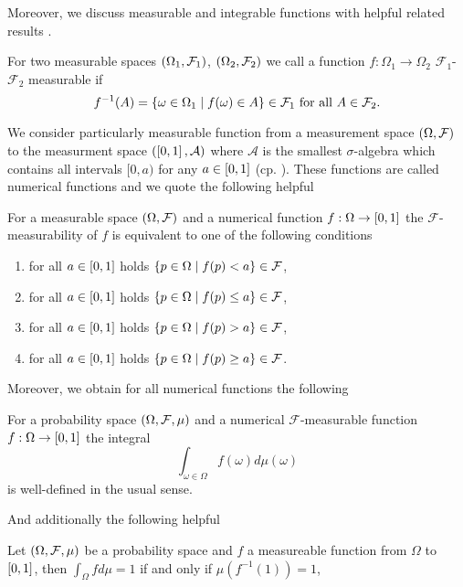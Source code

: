 Moreover, we discuss measurable and integrable functions with helpful related
results \cite[Chapter 7]{Bauer}.
\begin{definition}
  For two measurable spaces $\left(\Omega_{1}, \mathcal{F}_{1}\right)$, 
  $\left(\Omega_{2}, \mathcal{F}_{2}\right)$ we call a function 
  $f:\Omega_{1}\rightarrow\Omega_{2}$ $\mathcal{F}_{1}$-$\mathcal{F}_{2}$ 
  measurable if
  \begin{equation*}
    f^{-1}(A) = \left\{\omega\in\Omega_{1}\mid f(\omega)\in A\right\}\in\mathcal{F}_{1}
    \text{ for all }A\in\mathcal{F}_{2}.
  \end{equation*}
\end{definition}
We consider particularly measurable function from a measurement space 
$\left(\Omega, \mathcal{F}\right)$ to the measurment space
$\left(\left[0,1\right], \mathcal{A}\right)$ where $\mathcal{A}$ is the smallest
$\sigma$-algebra which contains all intervals $[0, a)$ for any 
$a\in\left[0,1\right]$ (cp. \cite[Chapter 4, Chapter 6]{Bauer}). These functions
are called numerical functions and we quote the following helpful
\begin{theorem}
  \cite[Theorem 9.2]{Bauer}
  For a measurable space $\left(\Omega, \mathcal{F}\right)$ and a numerical 
  function $f:\Omega\rightarrow\left[0,1\right]$ the 
  $\mathcal{F}$-measurability of $f$ is equivalent to one of the following 
  conditions
  \begin{enumerate}
    \item for all $a\in\left[0,1\right]$ holds 
      $\left\{p\in\Omega\mid f(p) < a\right\}\in\mathcal{F}$,
    \item for all $a\in\left[0,1\right]$ holds 
      $\left\{p\in\Omega\mid f(p) \leq a\right\}\in\mathcal{F}$,
    \item for all $a\in\left[0,1\right]$ holds 
      $\left\{p\in\Omega\mid f(p) > a\right\}\in\mathcal{F}$,
    \item for all $a\in\left[0,1\right]$ holds 
      $\left\{p\in\Omega\mid f(p) \geq a\right\}\in\mathcal{F}$.
  \end{enumerate}
\end{theorem}
Moreover, we obtain for all numerical functions the following
\begin{theorem}
  \cite[Theorem 11.6]{Bauer}
  For a probability space $\left(\Omega, \mathcal{F}, \mu\right)$ and a numerical 
  $\mathcal{F}$-measurable function $f:\Omega\rightarrow\left[0,1\right]$ the
  integral
  \begin{equation*}
    \int_{\omega\in\Omega}f(\omega)d\mu(\omega)
  \end{equation*}
  is well-defined in the usual sense.
\end{theorem}
And additionally the following helpful
\begin{lemma}
  \cite[Lemma 40]{RandAutoInfTrees} Let $\left(\Omega,\mathcal{F},\mu\right)$ be
  a probability space and $f$ a measureable function from $\Omega$ to
  $\left[0,1\right]$, then $\int_{\Omega}f d\mu = 1$ if and only if 
  $\mu(f^{-1}(1)) = 1$,
  \label{lem:almosteverywhere}
\end{lemma}

